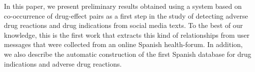 In this paper, we present preliminary results obtained using a system based on co-occurrence of drug-effect pairs as a first step in the study of detecting adverse drug reactions and drug indications from social media texts. To the best of our knowledge, this is the first work that extracts this kind of relationships from user messages that were collected from an online Spanish health-forum. In addition, we also describe the automatic construction of the first Spanish database for drug indications and adverse drug reactions.
